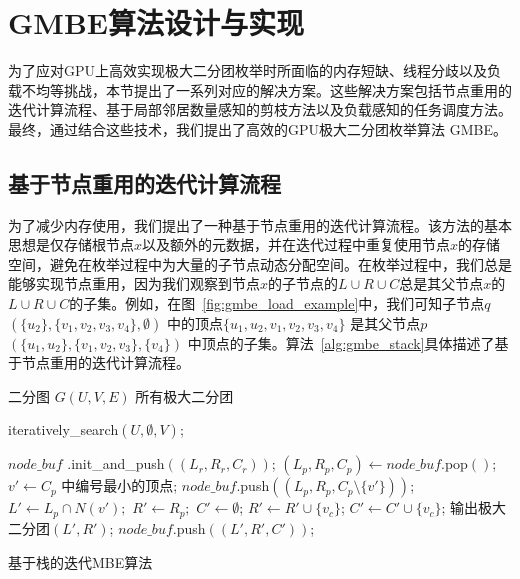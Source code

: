 \section{GMBE算法设计与实现}
为了应对GPU上高效实现极大二分团枚举时所面临的内存短缺、线程分歧以及负载不均等挑战，本节提出了一系列对应的解决方案。这些解决方案包括节点重用的迭代计算流程、基于局部邻居数量感知的剪枝方法以及负载感知的任务调度方法。最终，通过结合这些技术，我们提出了高效的GPU极大二分团枚举算法 GMBE。


\subsection{基于节点重用的迭代计算流程}
\label{subsec:gmbe_memory}
为了减少内存使用，我们提出了一种基于节点重用的迭代计算流程。该方法的基本思想是仅存储根节点$x$以及额外的元数据，并在迭代过程中重复使用节点$x$的存储空间，避免在枚举过程中为大量的子节点动态分配空间。在枚举过程中，我们总是能够实现节点重用，因为我们观察到节点$x$的子节点的$L\cup  R\cup C$总是其父节点$x$的$L\cup  R\cup C$的子集。例如，在图~\ref{fig:gmbe_load_example}中，我们可知子节点$q$ $(\{u_2\},\{v_1, v_2, v_3, v_4\}, \emptyset)$ 中的顶点$\{u_1, u_2, v_1, v_2, v_3, v_4\}$ 是其父节点$p$ $(\{u_1, u_2\}, \{v_1, v_2, v_3\},\{v_4\})$ 中顶点的子集。算法~\ref{alg:gmbe_stack}具体描述了基于节点重用的迭代计算流程。


\begin{algorithm} [H]
  \begin{algorithmic}[1]
    \normalsize
    \REQUIRE 二分图 $G(U,V,E)$
    \ENSURE 所有极大二分团
    
    \renewcommand{\algorithmicwhile}{\textbf{procedure}}
    \renewcommand{\algorithmicdo}{\textbf{:}}
    \STATE \textsf{iteratively\_search}$(U,\emptyset,V)$;

    \renewcommand{\algorithmicwhile}{\textbf{while}}
    \renewcommand{\algorithmicdo}{\textbf{do}}
      \STATE $node\_buf$ \textsf{.init\_and\_push}$((L_r,R_r,C_r))$;
        \STATE $(L_p, R_p, C_p) \leftarrow node\_buf$\textsf{.pop}$()$;
          \STATE $v' \leftarrow C_p$ 中编号最小的顶点; 
          \STATE $node\_buf$\textsf{.push}$((L_p,R_p,C_p \setminus \{v'\} ))$;
          \STATE $L' \leftarrow L_p \cap N(v');$ $R'\leftarrow R_p;$ $C' \leftarrow \emptyset$;
              \STATE $R' \leftarrow R' \cup \{v_c\}$;
              \STATE $C' \leftarrow C' \cup \{v_c\}$;
            \ENDIF
          \ENDFOR
        \ENDIF
          \STATE 输出极大二分团$(L', R')$;
          \STATE $node\_buf$\textsf{.push}$((L',R',C'))$;
        \ENDIF
      \ENDWHILE
    \ENDWHILE

  \end{algorithmic}
  \caption{基于栈的迭代MBE算法}
  \label{alg:gmbe_stack}
\end{algorithm}


